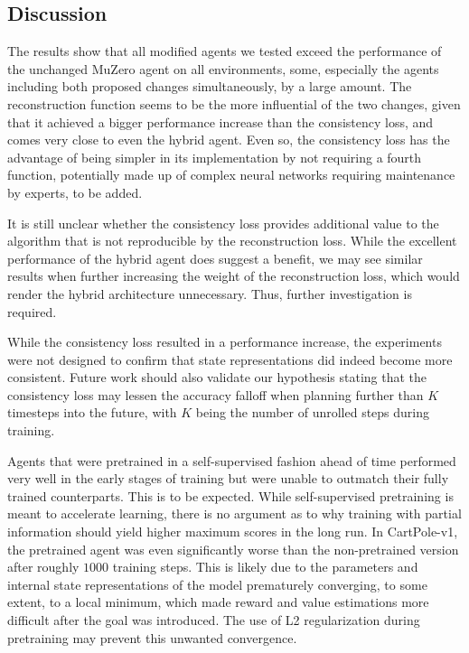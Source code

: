 \subsection{Discussion}
The results show that all modified agents we tested exceed the performance of the unchanged MuZero agent on all environments, some, especially the agents including both proposed changes simultaneously, by a large amount. The reconstruction function seems to be the more influential of the two changes, given that it achieved a bigger performance increase than the consistency loss, and comes very close to even the hybrid agent. Even so, the consistency loss has the advantage of being simpler in its implementation by not requiring a fourth function, potentially made up of complex neural networks requiring maintenance by experts, to be added.

It is still unclear whether the consistency loss provides additional value to the algorithm that is not reproducible by the reconstruction loss. While the excellent performance of the hybrid agent does suggest a benefit, we may see similar results when further increasing the weight of the reconstruction loss, which would render the hybrid architecture unnecessary. Thus, further investigation is required.

While the consistency loss resulted in a performance increase, the experiments were not designed to confirm that state representations did indeed become more consistent. Future work should also validate our hypothesis stating that the consistency loss may lessen the accuracy falloff when planning further than $K$ timesteps into the future, with $K$ being the number of unrolled steps during training.

Agents that were pretrained in a self-supervised fashion ahead of time performed very well in the early stages of training but were unable to outmatch their fully trained counterparts. This is to be expected. While self-supervised pretraining is meant to accelerate learning, there is no argument as to why training with partial information should yield higher maximum scores in the long run. In CartPole-v1, the pretrained agent was even significantly worse than the non-pretrained version after roughly $1000$ training steps. This is likely due to the parameters and internal state representations of the model prematurely converging, to some extent, to a local minimum, which made reward and value estimations more difficult after the goal was introduced. The use of L2 regularization during pretraining may prevent this unwanted convergence.